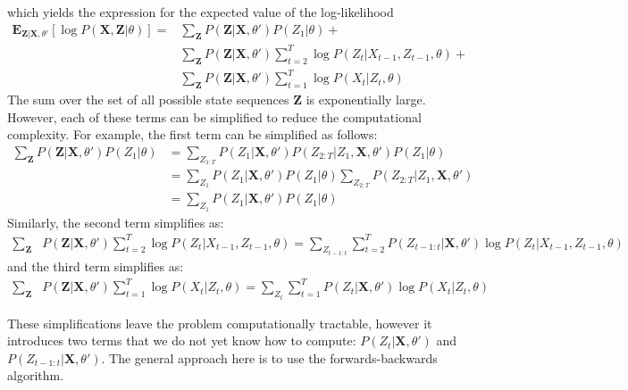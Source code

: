 \documentclass{amsart}
\theoremstyle{definition}
\theoremstyle{remark}
\numberwithin{equation}{section}
\begin{document}
which yields the expression for the expected value of the log-likelihood
\begin{align*}
\textbf{E}_{\textbf{Z}|\textbf{X},\theta'} \left[\log{P(\textbf{X},\textbf{Z}|\theta)}\right] = &\sum_\textbf{Z} P(\textbf{Z}|\textbf{X},\theta')P(Z_1|\theta) + \\
&\sum_\textbf{Z} P(\textbf{Z}|\textbf{X},\theta')\sum_{t=2}^T \log P(Z_t|X_{t-1}, Z_{t-1},\theta) + \\
&\sum_\textbf{Z} P(\textbf{Z}|\textbf{X},\theta')\sum_{t=1}^T \log P(X_t|Z_t,\theta)
\end{align*}
The sum over the set of all possible state sequences $\textbf{Z}$ is exponentially large. However, each of these terms can be simplified to reduce the computational complexity. For example, the first term can be simplified as follows:
\begin{align*}
\sum_\textbf{Z} P(\textbf{Z}|\textbf{X},\theta')P(Z_1|\theta) &= \sum_{Z_{1:T}} P(Z_1|\textbf{X},\theta')P(Z_{2:T}|Z_1,\textbf{X},\theta')P(Z_1|\theta)\\
&= \sum_{Z_1} P(Z_1|\textbf{X},\theta')P(Z_1|\theta)\sum_{Z_{2:T}} P(Z_{2:T}|Z_1,\textbf{X},\theta')\\
&= \sum_{Z_1} P(Z_1|\textbf{X},\theta')P(Z_1|\theta)
\end{align*}
Similarly, the second term simplifies as:
\begin{align*}
\sum_\textbf{Z}& P(\textbf{Z}|\textbf{X},\theta')\sum_{t=2}^T \log P(Z_t|X_{t-1}, Z_{t-1},\theta) = \sum_{Z_{t-1:t}}\sum_{t=2}^T P(Z_{t-1:t}|\textbf{X},\theta') \log P(Z_t|X_{t-1}, Z_{t-1},\theta)
\end{align*}
and the third term simplifies as:
\begin{align*}
\sum_\textbf{Z}& P(\textbf{Z}|\textbf{X},\theta')\sum_{t=1}^T \log P(X_t|Z_t,\theta) = \sum_{Z_t}\sum_{t=1}^T P(Z_t|\textbf{X},\theta') \log P(X_t|Z_t,\theta)
\end{align*}

These simplifications leave the problem computationally tractable, however it introduces two terms that we do not yet know how to compute: $P(Z_t|\textbf{X},\theta')$ and $P(Z_{t-1:t}|\textbf{X},\theta')$. The general approach here is to use the forwards-backwards algorithm.
\end{document}
